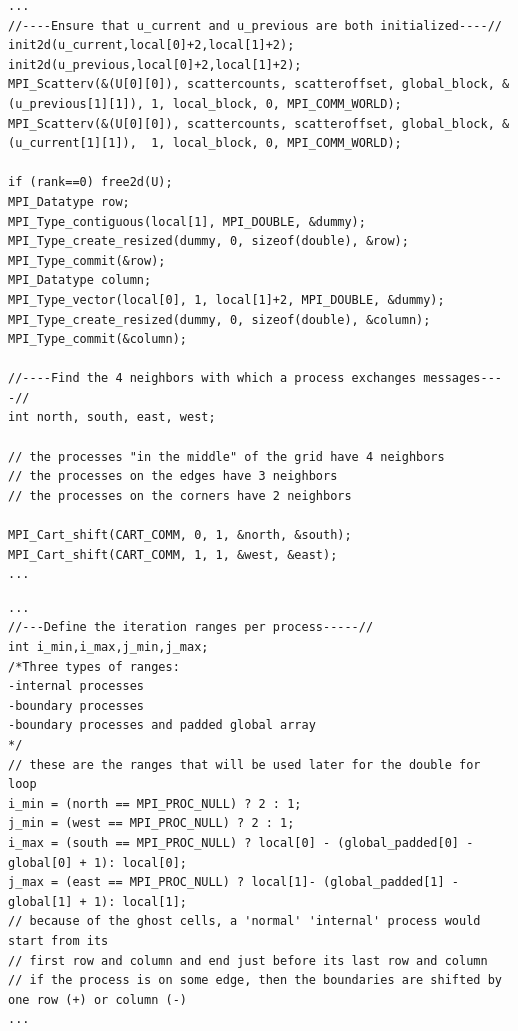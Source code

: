 \documentclass{article}
\begin{document}
\begin{lstlisting}[caption={Jacobi MPI setup}, style=CStyle, label={lst:mpi-jacobi-setup}]
...
//----Ensure that u_current and u_previous are both initialized----//
init2d(u_current,local[0]+2,local[1]+2);
init2d(u_previous,local[0]+2,local[1]+2);
MPI_Scatterv(&(U[0][0]), scattercounts, scatteroffset, global_block, &(u_previous[1][1]), 1, local_block, 0, MPI_COMM_WORLD);
MPI_Scatterv(&(U[0][0]), scattercounts, scatteroffset, global_block, &(u_current[1][1]),  1, local_block, 0, MPI_COMM_WORLD);

if (rank==0) free2d(U);
MPI_Datatype row;
MPI_Type_contiguous(local[1], MPI_DOUBLE, &dummy);
MPI_Type_create_resized(dummy, 0, sizeof(double), &row);
MPI_Type_commit(&row);
MPI_Datatype column;
MPI_Type_vector(local[0], 1, local[1]+2, MPI_DOUBLE, &dummy);
MPI_Type_create_resized(dummy, 0, sizeof(double), &column);
MPI_Type_commit(&column);

//----Find the 4 neighbors with which a process exchanges messages----//
int north, south, east, west;

// the processes "in the middle" of the grid have 4 neighbors
// the processes on the edges have 3 neighbors
// the processes on the corners have 2 neighbors

MPI_Cart_shift(CART_COMM, 0, 1, &north, &south);
MPI_Cart_shift(CART_COMM, 1, 1, &west, &east);
...
\end{lstlisting}

\begin{lstlisting}[caption={Jacobi MPI ranges}, style=CStyle, label={lst:mpi-jacobi-ranges}]
...
//---Define the iteration ranges per process-----//
int i_min,i_max,j_min,j_max;
/*Three types of ranges:
-internal processes
-boundary processes
-boundary processes and padded global array
*/
// these are the ranges that will be used later for the double for loop
i_min = (north == MPI_PROC_NULL) ? 2 : 1;
j_min = (west == MPI_PROC_NULL) ? 2 : 1;
i_max = (south == MPI_PROC_NULL) ? local[0] - (global_padded[0] - global[0] + 1): local[0];
j_max = (east == MPI_PROC_NULL) ? local[1]- (global_padded[1] - global[1] + 1): local[1];
// because of the ghost cells, a 'normal' 'internal' process would start from its
// first row and column and end just before its last row and column
// if the process is on some edge, then the boundaries are shifted by one row (+) or column (-)
...
\end{lstlisting}
\end{document}
